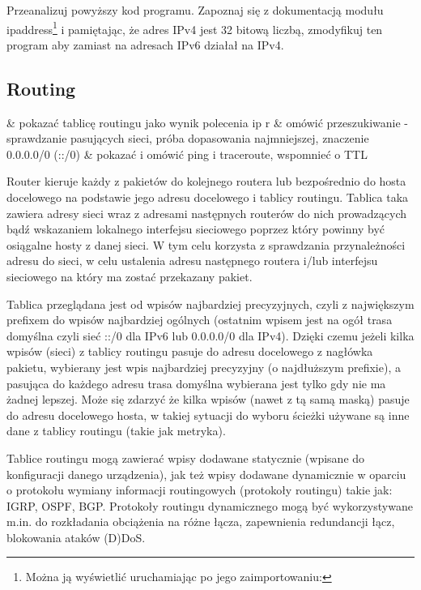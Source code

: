 \documentclass{pdfBooklets}
\begin{document}
\begin{Zadanie}{}{}
Przeanalizuj powyższy kod programu. Zapoznaj się z dokumentacją modułu ipaddress\footnote{Można ją wyświetlić uruchamiając po jego zaimportowaniu: } i pamiętając, że adres IPv4 jest 32 bitową liczbą, zmodyfikuj ten program aby zamiast na adresach IPv6 działał na IPv4.
\end{Zadanie}

\subsection{Routing}

\begin{teacherOnly}
	\begin{easylist}[itemize]
		& pokazać tablicę routingu jako wynik polecenia ip r
		& omówić przeszukiwanie - sprawdzanie pasujących sieci, próba dopasowania najmniejszej, znaczenie 0.0.0.0/0 (::/0)
		& pokazać i omówić ping i traceroute, wspomnieć o TTL
	\end{easylist}
\end{teacherOnly}

Router kieruje każdy z pakietów do kolejnego routera lub bezpośrednio do hosta docelowego na podstawie jego adresu docelowego i tablicy routingu. Tablica taka zawiera adresy sieci wraz z adresami następnych routerów do nich prowadzących bądź wskazaniem lokalnego interfejsu sieciowego poprzez który powinny być osiągalne hosty z danej sieci. W tym celu korzysta z sprawdzania przynależności adresu do sieci, w celu ustalenia adresu następnego routera i/lub interfejsu sieciowego na który ma zostać przekazany pakiet.

Tablica przeglądana jest od wpisów najbardziej precyzyjnych, czyli z największym prefixem do wpisów najbardziej ogólnych (ostatnim wpisem jest na ogół trasa domyślna czyli sieć ::/0 dla IPv6 lub 0.0.0.0/0 dla IPv4). Dzięki czemu jeżeli kilka wpisów (sieci) z tablicy routingu pasuje do adresu docelowego z nagłówka pakietu, wybierany jest wpis najbardziej precyzyjny (o najdłuższym prefixie), a pasująca do każdego adresu trasa domyślna wybierana jest tylko gdy nie ma żadnej lepszej. Może się zdarzyć że kilka wpisów (nawet z tą samą maską) pasuje do adresu docelowego hosta, w takiej sytuacji do wyboru ścieżki używane są inne dane z tablicy routingu (takie jak metryka).

Tablice routingu mogą zawierać wpisy dodawane statycznie (wpisane do konfiguracji danego urządzenia), jak też wpisy dodawane dynamicznie w oparciu o protokołu wymiany informacji routingowych (protokoły routingu) takie jak: IGRP, OSPF, BGP. Protokoły routingu dynamicznego mogą być wykorzystywane m.in. do rozkładania obciążenia na różne łącza, zapewnienia redundancji łącz, blokowania ataków (D)DoS.
\end{document}
